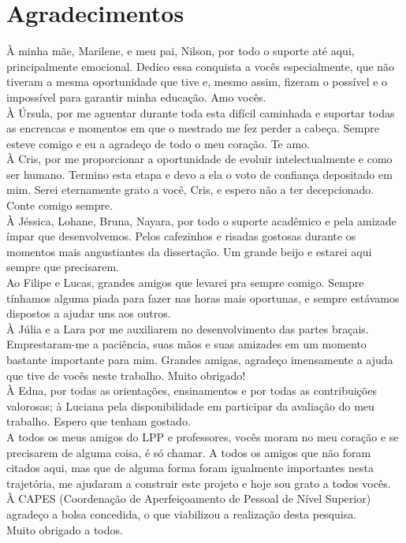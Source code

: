 \section*{Agradecimentos}
\vspace*{1.5cm}
\thispagestyle{empty}
\begin{onehalfspace}
    À minha mãe, Marilene, e meu pai, Nilson, por todo o suporte até aqui, principalmente emocional.
    Dedico essa conquista a vocês especialmente, que não tiveram a mesma oportunidade que tive
    e, mesmo assim, fizeram o possível e o impossível para garantir minha educação. Amo vocês.\\
    À Úrsula, por me aguentar durante toda esta difícil caminhada e suportar todas as encrencas e
    momentos em que o mestrado me fez perder a cabeça. Sempre esteve comigo e eu a agradeço
    de todo o meu coração. Te amo.\\
    À Cris, por me proporcionar a oportunidade de evoluir intelectualmente e como ser humano.
    Termino esta etapa e devo a ela o voto de confiança depositado em mim. Serei eternamente grato
    a você, Cris, e espero não a ter decepcionado. Conte comigo sempre.\\
    À Jéssica, Lohane, Bruna, Nayara, por todo o suporte acadêmico e pela amizade ímpar que
    desenvolvemos. Pelos cafezinhos e risadas gostosas durante os momentos mais angustiantes da
    dissertação. Um grande beijo e estarei aqui sempre que precisarem.\\
    Ao Filipe e Lucas, grandes amigos que levarei pra sempre comigo. Sempre tínhamos alguma piada
    para fazer nas horas mais oportunas, e sempre estávamos dispostos a ajudar uns aos outros.\\
    À Júlia e a Lara por me auxiliarem no desenvolvimento das partes braçais. Emprestaram-me a
    paciência, suas mãos e suas amizades em um momento bastante importante para mim. Grandes
    amigas, agradeço imensamente a ajuda que tive de vocês neste trabalho. Muito obrigado!\\
    À Edna, por todas as orientações, ensinamentos e por todas as contribuições valorosas; à Luciana
    pela disponibilidade em participar da avaliação do meu trabalho. Espero que tenham gostado.\\
    A todos os meus amigos do LPP e professores, vocês moram no meu coração e se precisarem de
    alguma coisa, é só chamar. A todos os amigos que não foram citados aqui, mas que de alguma
    forma foram igualmente importantes nesta trajetória, me ajudaram a construir este projeto e
    hoje sou grato a todos vocês.\\
    À CAPES (Coordenação de Aperfeiçoamento de Pessoal de Nível Superior) agradeço a bolsa
    concedida, o que viabilizou a realização desta pesquisa.\\
    Muito obrigado a todos.\\
\end{onehalfspace}